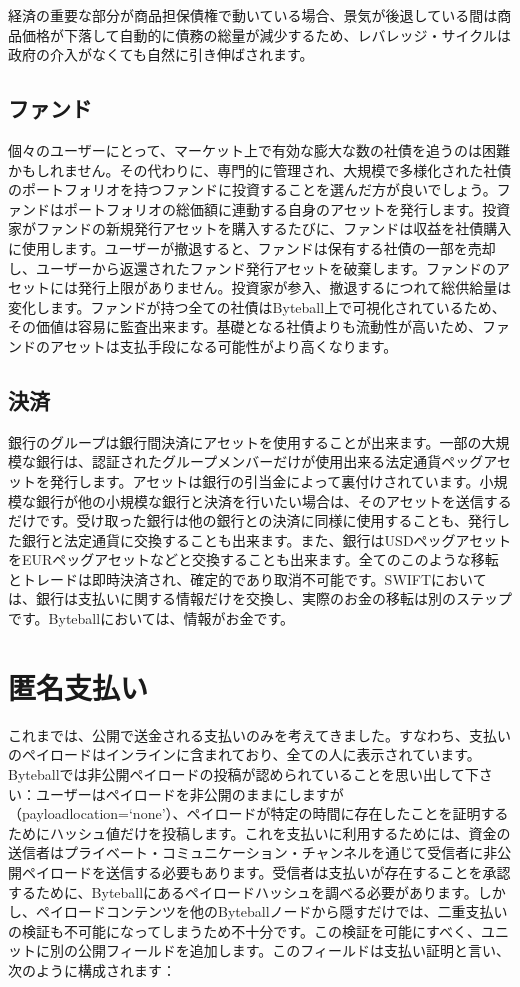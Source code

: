 \documentclass[a4paper, dvipdfmx]{jsarticle}
\begin{document}
経済の重要な部分が商品担保債権で動いている場合、景気が後退している間は商品価格が下落して自動的に債務の総量が減少するため、レバレッジ・サイクルは政府の介入がなくても自然に引き伸ばされます。

\subsection{ファンド}
個々のユーザーにとって、マーケット上で有効な膨大な数の社債を追うのは困難かもしれません。その代わりに、専門的に管理され、大規模で多様化された社債のポートフォリオを持つファンドに投資することを選んだ方が良いでしょう。ファンドはポートフォリオの総価額に連動する自身のアセットを発行します。投資家がファンドの新規発行アセットを購入するたびに、ファンドは収益を社債購入に使用します。ユーザーが撤退すると、ファンドは保有する社債の一部を売却し、ユーザーから返還されたファンド発行アセットを破棄します。ファンドのアセットには発行上限がありません。投資家が参入、撤退するにつれて総供給量は変化します。ファンドが持つ全ての社債はByteball上で可視化されているため、その価値は容易に監査出来ます。基礎となる社債よりも流動性が高いため、ファンドのアセットは支払手段になる可能性がより高くなります。

\subsection{決済}
銀行のグループは銀行間決済にアセットを使用することが出来ます。一部の大規模な銀行は、認証されたグループメンバーだけが使用出来る法定通貨ペッグアセットを発行します。アセットは銀行の引当金によって裏付けされています。小規模な銀行が他の小規模な銀行と決済を行いたい場合は、そのアセットを送信するだけです。受け取った銀行は他の銀行との決済に同様に使用することも、発行した銀行と法定通貨に交換することも出来ます。また、銀行はUSDペッグアセットをEURペッグアセットなどと交換することも出来ます。全てのこのような移転とトレードは即時決済され、確定的であり取消不可能です。SWIFTにおいては、銀行は支払いに関する情報だけを交換し、実際のお金の移転は別のステップです。Byteballにおいては、情報がお金です。

\section{匿名支払い}
これまでは、公開で送金される支払いのみを考えてきました。すなわち、支払いのペイロードはインラインに含まれており、全ての人に表示されています。Byteballでは非公開ペイロードの投稿が認められていることを思い出して下さい：ユーザーはペイロードを非公開のままにしますが（payload\textunderscore location=`none'）、ペイロードが特定の時間に存在したことを証明するためにハッシュ値だけを投稿します。これを支払いに利用するためには、資金の送信者はプライベート・コミュニケーション・チャンネルを通じて受信者に非公開ペイロードを送信する必要もあります。受信者は支払いが存在することを承認するために、Byteballにあるペイロードハッシュを調べる必要があります。しかし、ペイロードコンテンツを他のByteballノードから隠すだけでは、二重支払いの検証も不可能になってしまうため不十分です。この検証を可能にすべく、ユニットに別の公開フィールドを追加します。このフィールドは支払い証明と言い、次のように構成されます：
\end{document}
